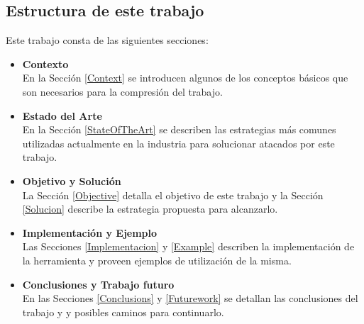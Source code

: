 \bigskip

\subsection{Estructura de este trabajo}
\noindent Este trabajo consta de las siguientes secciones:

\begin{itemize}
	\item {\bf Contexto}\\
		En la Sección \ref{Context} se introducen algunos de los conceptos básicos que
		son necesarios para la compresión del trabajo.
	\item {\bf Estado del Arte}\\
		En la Sección \ref{StateOfTheArt} se describen las estrategias más comunes
		utilizadas actualmente en la industria para solucionar atacados por este trabajo.
	\item{\bf Objetivo y Solución}\\
		La Sección \ref{Objective} detalla el objetivo de este trabajo y la Sección
		\ref{Solucion} describe la estrategia propuesta para alcanzarlo.
	\item{\bf Implementación y Ejemplo}\\
		Las Secciones \ref{Implementacion} y \ref{Example} describen la
		implementación de la herramienta y proveen ejemplos de utilización de la misma.
	\item{\bf Conclusiones y Trabajo futuro}\\
		En las Secciones \ref{Conclusions} y \ref{Futurework} se detallan las
		conclusiones del trabajo y y posibles caminos para continuarlo.
\end{itemize}
